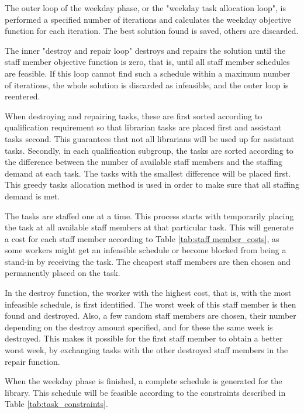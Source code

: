 The outer loop of the weekday phase, or the "weekday task allocation loop", is performed a specified number of iterations and calculates the weekday objective function for each iteration. The best solution found is saved, others are discarded. 

The inner "destroy and repair loop" destroys and repairs the solution until the staff member objective function is zero, that is, until all staff member schedules are feasible. If this loop cannot find such a schedule within a maximum number of iterations, the whole solution is discarded as infeasible, and the outer loop is reentered.

When destroying and repairing tasks, these are first sorted according to qualification requirement so that librarian tasks are placed first and assistant tasks second. This guarantees that not all librarians will be used up for assistant tasks. Secondly, in each qualification subgroup, the tasks are sorted according to the difference between the number of available staff members and the staffing demand at each task. The tasks with the smallest difference will be placed first. This greedy tasks allocation method is used in order to make sure that all staffing demand is met.

The tasks are staffed one at a time. This process starts with temporarily placing the task at all available staff members at that particular task. This will generate a cost for each staff member according to Table \ref{tab:staff member_costs}, as some workers might get an infeasible schedule or become blocked from being a stand-in by receiving the task. The cheapest staff members are then chosen and permanently placed on the task.


In the destroy function, the worker with the highest cost, that is, with the most infeasible schedule, is first identified. The worst week of this staff member is then found and destroyed. Also, a few random staff members are chosen, their number depending on the destroy amount specified, and for these the same week is destroyed. This makes it possible for the first staff member to obtain a better worst week, by exchanging tasks with the other destroyed staff members in the repair function.

When the weekday phase is finished, a complete schedule is generated for the library. This schedule will be feasible according to the constraints described in Table \ref{tab:task_constraints}. 

